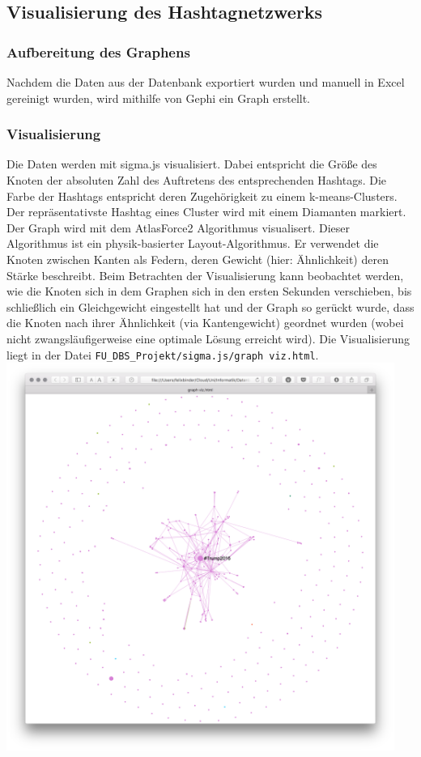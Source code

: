 \documentclass[BCOR0mm,fontsize=12pt,paper=a4,final,numbers=noenddot]{scrartcl}
\begin{document}
\subsection{Visualisierung des Hashtagnetzwerks}
\subsubsection{Aufbereitung des Graphens}
Nachdem die Daten aus der Datenbank exportiert wurden und manuell in Excel gereinigt wurden, wird mithilfe von Gephi ein Graph erstellt. 
\subsubsection{Visualisierung}
Die Daten werden mit sigma.js visualisiert. Dabei entspricht die Größe des Knoten der absoluten Zahl des Auftretens des entsprechenden Hashtags. Die Farbe der Hashtags entspricht deren Zugehörigkeit zu einem k-means-Clusters. Der repräsentativste Hashtag eines Cluster wird mit einem Diamanten markiert. Der Graph wird mit dem AtlasForce2 Algorithmus visualisert. Dieser Algorithmus ist ein physik-basierter Layout-Algorithmus. Er verwendet die Knoten zwischen Kanten als Federn, deren Gewicht (hier: Ähnlichkeit) deren Stärke beschreibt. Beim Betrachten der Visualisierung kann beobachtet werden, wie die Knoten sich in dem Graphen sich in den ersten Sekunden verschieben, bis schließlich ein Gleichgewicht eingestellt hat und der Graph so gerückt wurde, dass die Knoten nach ihrer Ähnlichkeit (via Kantengewicht) geordnet wurden (wobei nicht zwangsläufigerweise eine optimale Lösung erreicht wird). Die Visualisierung liegt in der Datei \texttt{FU\_DBS\_Projekt/sigma.js/graph viz.html}.\\
\includegraphics[width=0.95\textwidth]{visualized.png}
\end{document}
